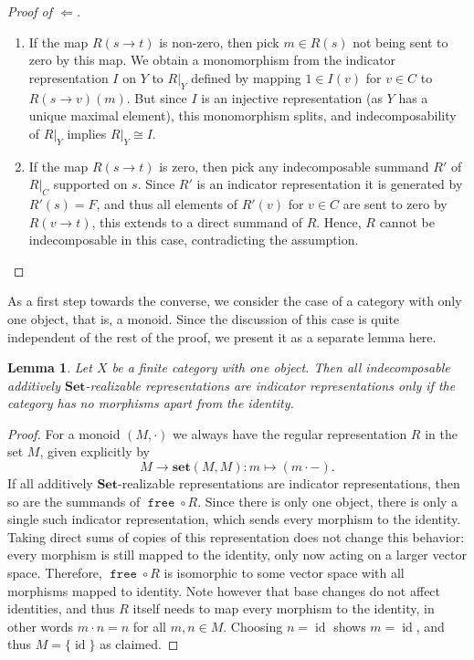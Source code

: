 \documentclass[a4paper]{amsart}
\theoremstyle{plain}
\newtheorem{lemma}[theorem]{Lemma}
\theoremstyle{definition}
\theoremstyle{remark}
\newcommand{\funct}[1]{\operatorname{\mathtt{#1}}}
\newcommand{\Set}{\mathbf{Set}}
\newcommand{\set}{\mathbf{set}}
\begin{document}
\begin{proof}[Proof of \( \Leftarrow \)]
\begin{enumerate}
\item If the map $R(s \to t)$ is non-zero, then pick \( m \in R(s) \) not being sent to zero by this map. We obtain a monomorphism from the indicator representation $I$ on $Y$ to $R|_Y$ defined by mapping $1 \in I(v)$ for $v \in C$ to $R(s \to v)(m)$. But since $I$ is an injective representation (as $Y$ has a unique maximal element), this monomorphism splits, and indecomposability of $R|_Y$ implies $R|_Y \cong I$.
\item If the map $R(s \to t)$ is zero, then pick any indecomposable summand \( R' \) of $R|_C$ supported on $s$. Since \( R' \) is an indicator representation it is generated by \( R'(s) = F \), and thus all elements of \( R'(v) \) for $v \in C$ are sent to zero by \( R(v \to t) \), this extends to a direct summand of \( R \). Hence, $R$ cannot be indecomposable in this case, contradicting the assumption. \qedhere
\end{enumerate}
\end{proof}

As a first step towards the converse, we consider the case of a category with only one object, that is, a monoid. Since the discussion of this case is quite independent of the rest of the proof, we present it as a separate lemma here.

\begin{lemma} \label{lemma:indicator_for_monoids}
Let \( X \) be a finite category with one object. Then all indecomposable additively \( \Set \)-realizable representations are indicator representations only if the category has no morphisms apart from the identity.
\end{lemma}

\begin{proof}
For a monoid \( (M, \cdot) \) we always have the regular representation \( R \) in the set \( M \), given explicitly by
\[ M \to \set(M,M) \colon m \mapsto (m \cdot - ). \]
If all additively \( \Set \)-realizable representations are indicator representations, then so are the summands of
$\funct{free} \circ R$. Since there is only one object, there is only a single such indicator representation, which sends every morphism to the identity. Taking direct sums of copies of this representation does not change this behavior: every morphism is still mapped to the identity, only now acting on a larger vector space. Therefore, \( \funct{free} \circ R \) is isomorphic to some vector space with all morphisms mapped to identity. Note however that base changes do not affect identities, and thus \( R \) itself needs to map every morphism to the identity, in other words \( m \cdot n = n \) for all \( m, n \in M \). Choosing \( n = \operatorname{id} \) shows \( m = \operatorname{id} \), and thus \( M = \{ \operatorname{id} \} \) as claimed. 
\end{proof}
\end{document}
